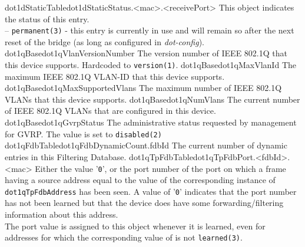   {dot1dStaticTable}{dot1dStaticStatus.<mac>.<receivePort>}{
	    This object indicates the status of this entry.\\
		-- \texttt{permanent(3)} - this entry is currently in use and
		    will remain so after the next reset of the
		    bridge (as long as configured in \textit{dot-config}).}
  {dot1qBase}{dot1qVlanVersionNumber}{
	    The version number of IEEE 802.1Q that this device
	    supports. Hardcoded to \texttt{version(1)}.}
  {dot1qBase}{dot1qMaxVlanId}{
	    The maximum IEEE 802.1Q VLAN-ID that this device
	    supports.}
  {dot1qBase}{dot1qMaxSupportedVlans}{
	    The maximum number of IEEE 802.1Q VLANs that this
	    device supports.}
  {dot1qBase}{dot1qNumVlans}{
	    The current number of IEEE 802.1Q VLANs that are
	    configured in this device.}
  {dot1qBase}{dot1qGvrpStatus}{
	    The administrative status requested by management for
	    GVRP.  The value is set to \texttt{disabled(2)}}
  {dot1qFdbTable}{dot1qFdbDynamicCount.fdbId}{
	    The current number of dynamic entries in this
	    Filtering Database.}
  {dot1qTpFdbTable}{dot1qTpFdbPort.<fdbId>.<mac>}{
	    Either the value '\texttt{0}', or the port number of the port on
	    which a frame having a source address equal to the value
	    of the corresponding instance of \texttt{dot1qTpFdbAddress} has
	    been seen.  A value of '\texttt{0}' indicates that the port
	    number has not been learned but that the device does
	    have some forwarding/filtering information about this
	    address.\\
	    The port value is assigned to
	    this object whenever it is learned, even for addresses
	    for which the corresponding value of
	    \texttt{}
	    is not \texttt{learned(3)}.}
